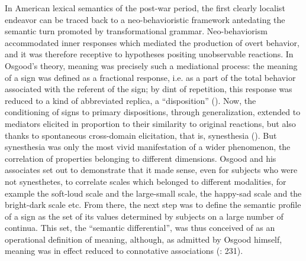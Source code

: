 \documentclass[output=paper]{langscibook}
\begin{document}
In American lexical semantics of the post-war period, the first clearly localist endeavor can be traced back to a neo-behavioristic framework antedating the semantic turn promoted by transformational grammar. Neo-behaviorism accommodated inner responses which mediated the production of overt behavior, and it was therefore receptive to hypotheses positing unobservable reactions. In Osgood’s theory, meaning was precisely such a mediational process: the meaning of a sign was defined as a fractional response, i.e. as a part of the total behavior associated with the referent of the sign; by dint of repetition, this response was reduced to a kind of abbreviated replica, a “disposition” (\citealt{osgood_nature_1952}). Now, the conditioning of signs to primary dispositions, through generalization, extended to mediators elicited in proportion to their similarity to original reactions, but also thanks to spontaneous cross-domain elicitation, that is, synesthesia (\citealt{karwoski_studies_1942}). But synesthesia was only the most vivid manifestation of a wider phenomenon, the correlation of properties belonging to different dimensions. Osgood and his associates set out to demonstrate that it made sense, even for subjects who were not synesthetes, to correlate scales which belonged to different modalities, for example the soft-loud scale and the large-small scale, the happy-sad scale and the bright-dark scale etc. From there, the next step was to define the semantic profile of a sign as the set of its values determined by subjects on a large number of continua. This set, the “semantic differential”, was thus conceived of as an operational definition of meaning, although, as admitted by Osgood himself, meaning was in effect reduced to connotative associations (\citealt{osgood_nature_1952}: 231).
\end{document}
